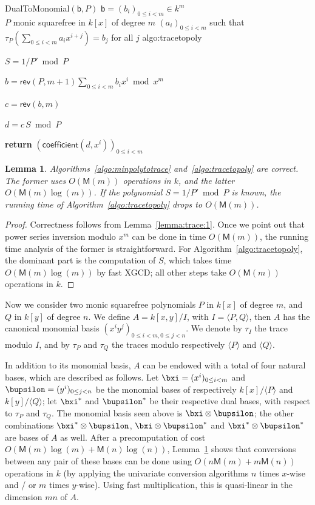 \documentclass{sig-alternate}
\def\M {\ensuremath{\mathsf{M}}}
\def\vb {\ensuremath{\mathsf{b}}}
\def\coeff {\ensuremath{\mathsf{coefficient}}}
\def\rev {\ensuremath{\mathsf{rev}}}
\newcounter{algo}
\newenvironment{algorithm_endline}[4]{\small\begin{center}\begin{minipage}{0.48\textwidth}
      \refstepcounter{algo}
      \label{#4}
      \sf
      \rule{\textwidth}{0.2pt}\\
      \makebox[\textwidth][c]{Algorithm~\arabic{algo}:~\textbf{#1}}\\
      \rule[0.5\baselineskip]{\textwidth}{0.2pt}\\

      \vspace{-12pt}

      \parbox{\textwidth}{\textbf{Input} #2}
      \parbox{\textwidth}{\textbf{Output} #3}

\vspace{-7pt}

      \begin{enumerate*}}{\end{enumerate*}
      \vspace{-11pt}
      \rule{\textwidth}{0.2pt}
\end{minipage}\end{center}
}
\newcommand{\ang}[1]{\langle#1\rangle}
\newtheorem{Lemma}{Lemma}
\begin{document}
\begin{algorithm_endline}
{DualToMonomial$(\vb, P)$}
{$\vb=(b_i)_{0 \le i < m} \in k^m$\\ $P$ monic squarefree in $k[x]$ of degree $m$}
{$(a_i)_{0 \le i < m}$ such that $\tau_P(\sum_{0 \le i < m} a_i x^{i+j}) = b_j$ for all $j$}
{algo:tracetopoly}
\item $S = 1/P' \bmod P$
\item $b= \rev(P,m+1) \sum_{0 \le i < m} b_i x^i \bmod x^m$
\item $c= \rev(b, m)$
\item $d =c\, S \bmod P$
\item {\bf return} $(\coeff(d,x^i))_{0 \le i < m}$
\end{algorithm_endline}

\begin{Lemma}\label{lemma:uniconv}
  Algorithms~\ref{algo:minpolytotrace} and~\ref{algo:tracetopoly} are
  correct. The former uses $O(\M(m))$ operations in $k$, and the
  latter $O(\M(m)\log(m))$.  If the polynomial $S=1/P' \bmod P$ is
  known, the running time of Algorithm~\ref{algo:tracetopoly} drops to
  $O(\M(m))$.
\end{Lemma}
\begin{proof}
  Correctness follows from Lemma~\ref{lemma:trace:1}.  Once we point
  out that power series inversion modulo $x^m$ can be done in time
  $O(\M(m))$, the running time analysis of the former is
  straightforward. For Algorithm~\ref{algo:tracetopoly}, the dominant
  part is the computation of $S$, which takes time $O(\M(m)\log(m))$
  by fast XGCD; all other steps take $O(\M(m))$ operations in $k$.
\end{proof}

 Now we consider two monic
squarefree polynomials $P$ in $k[x]$ of degree $m$, and $Q$ in $k[y]$
of degree $n$. We define $A=k[x,y]/I$, with $I=\ang{P,Q}$,
then $A$ has the canonical monomial basis $(x^i y^j)_{0 \le i <m, 0
  \le j <
  n}$. %
We
denote by $\tau_I$ the trace modulo $I$, and by $\tau_P$ and $\tau_Q$
the traces modulo respectively $\ang{P}$ and $\ang{Q}$.

In addition to its monomial basis, $A$ can be endowed with a total of
four natural bases, which are described as follows. Let $\bxi=(x^i)_{0
  \le i < m}$ and $\bupsilon=(y^i)_{0 \le j < n}$ be the monomial
bases of respectively $k[x]/\ang{P}$ and $k[y]/\ang{Q}$; let
$\bxi^\ast$ and $\bupsilon^\ast$ be their respective dual bases, with
respect to $\tau_P$ and $\tau_Q$. The monomial basis seen above is
$\bxi \otimes \bupsilon$; the other combinations $\bxi^\ast \otimes
\bupsilon$, $\bxi \otimes \bupsilon^\ast$ and $\bxi^\ast \otimes
\bupsilon^\ast$ are bases of $A$ as well. After a precomputation of
cost $O(\M(m)\log(m) + \M(n)\log(n))$, Lemma~\ref{lemma:uniconv} shows
that conversions between any pair of these bases can be done using
$O(n\M(m)+m\M(n))$ operations in $k$ (by applying the univariate
conversion algorithms $n$ times $x$-wise and / or $m$ times
$y$-wise). Using fast multiplication, this is quasi-linear in the
dimension $mn$ of $A$.
\end{document}
